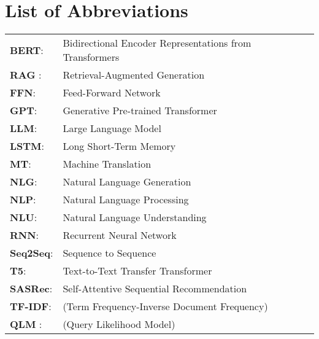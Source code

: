 \chapter*{List of Abbreviations }
\pagestyle{fancy}
\pagestyle{fancy}
\pagestyle{fancy}\rhead{\textbf \footnotesize\it{}}

\begin{tabular}{ll}

	\textbf{BERT}:& Bidirectional Encoder Representations from Transformers\\
	\textbf{RAG} :& Retrieval-Augmented Generation\\
	\textbf{FFN}:& Feed-Forward Network\\
	\textbf{GPT}:& Generative Pre-trained Transformer\\
	\textbf{LLM}:& Large Language Model\\
	\textbf{LSTM}:& Long Short-Term Memory\\
	\textbf{MT}:& Machine Translation\\
	\textbf{NLG}:& Natural Language Generation\\
	\textbf{NLP}:& Natural Language Processing\\
	\textbf{NLU}:& Natural Language Understanding\\
	\textbf{RNN}:& Recurrent Neural Network\\
	\textbf{Seq2Seq}:& Sequence to Sequence\\
	\textbf{T5}:& Text-to-Text Transfer Transformer\\
	\textbf{SASRec}:&  Self-Attentive Sequential Recommendation\\
	\textbf{TF-IDF}: & (Term Frequency-Inverse Document Frequency)\\
	\textbf{QLM }:& (Query Likelihood Model)\\
\end{tabular}